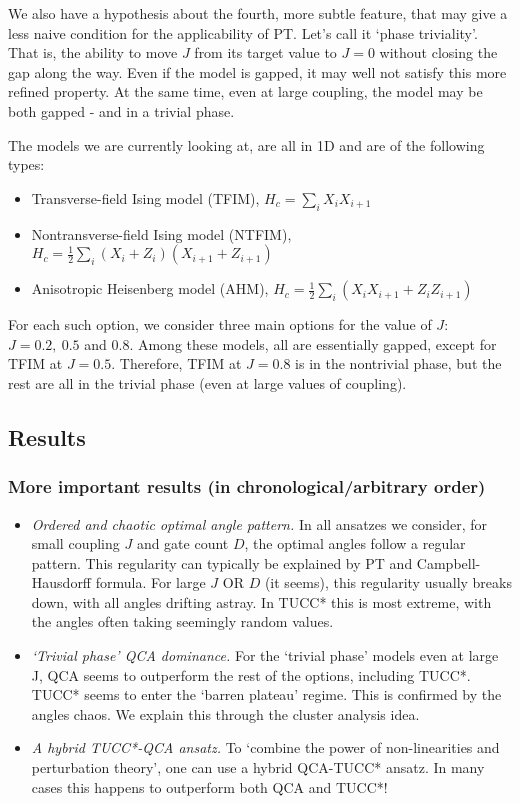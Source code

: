 \documentclass[10pt, a4paper]{article}
\begin{document}
We also have a hypothesis about the fourth, more subtle feature, that may give a less naive condition for the applicability of PT. Let's call it `phase triviality'. That is, the ability to move $J$ from its target value to $J=0$ without closing the gap along the way. Even if the model is gapped, it may well not satisfy this more refined property. At the same time, even at large coupling, the model may be both gapped - and in a trivial phase.

The models we are currently looking at, are all in 1D and are of the following types:
\begin{itemize}
\item Transverse-field Ising model (TFIM), $H_c=\sum_i X_i X_{i+1}$
\item Nontransverse-field Ising model (NTFIM), $H_c=\frac{1}{2}\sum_i (X_i+Z_i) (X_{i+1}+Z_{i+1})$
\item Anisotropic Heisenberg model (AHM),  $H_c=\frac{1}{2}\sum_i (X_iX_{i+1}+Z_iZ_{i+1})$
\end{itemize}

For each such option, we consider three main options for the value of $J$: $J=0.2,~0.5$ and $0.8$. Among these models, all are essentially gapped, except for TFIM at $J=0.5$. Therefore, TFIM at $J=0.8$ is in the nontrivial phase, but the rest are all in the trivial phase (even at large values of coupling).

\subsection*{Results}
\subsubsection*{More important results (in chronological/arbitrary order)}

\begin{itemize}
\item \textit{Ordered and chaotic optimal angle pattern.} In all ansatzes we consider, for small coupling $J$ and gate count $D$, the optimal angles follow a regular pattern. This regularity can typically be explained by PT and Campbell-Hausdorff formula. For large $J$ OR $D$ (it seems), this regularity usually breaks down, with all angles drifting astray. In TUCC* this is most extreme, with the angles often taking seemingly random values. 
\item \textit{`Trivial phase' QCA dominance.} For the `trivial phase' models even at large J, QCA seems to outperform the rest of the options, including TUCC*. TUCC* seems to enter the `barren plateau' regime. This is confirmed by the angles chaos. We explain this through the cluster analysis idea.
\item \textit{A hybrid TUCC*-QCA ansatz.} To `combine the power of non-linearities and perturbation theory', one can use a hybrid QCA-TUCC* ansatz. In many cases this happens to outperform both QCA and TUCC*!
\end{itemize}
\end{document}
